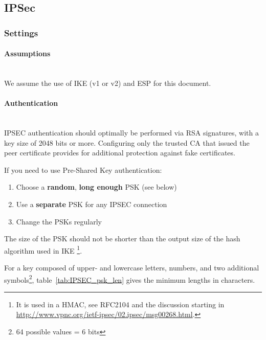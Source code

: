 
\subsection{IPSec}
\label{section:IPSECgeneral}


\subsubsection{Settings}

\paragraph*{Assumptions}\mbox{}\\
We assume the use of IKE (v1 or v2) and ESP for this document.

\paragraph*{Authentication}\mbox{}\\
IPSEC authentication should optimally be performed via RSA signatures,
with a key size of 2048 bits or more. Configuring only the trusted CA
that issued the peer certificate provides for additional protection
against fake certificates.

If you need to use Pre-Shared Key authentication:

\begin{enumerate}
\item Choose a \textbf{random}, \textbf{long enough} PSK (see below)
\item Use a \textbf{separate} PSK for any IPSEC connection
\item Change the PSKs regularly
\end{enumerate}

The size of the PSK should not be shorter than the output size of
the hash algorithm used in IKE \footnote{It is used in a HMAC, see
RFC2104\cite{rfc2104} and the discussion starting
in \url{http://www.vpnc.org/ietf-ipsec/02.ipsec/msg00268.html}.}.

For a key composed of upper- and lowercase letters, numbers, and two
additional symbols\footnote{64 possible values = 6 bits},
table~\ref{tab:IPSEC_psk_len} gives the minimum lengths in characters.

